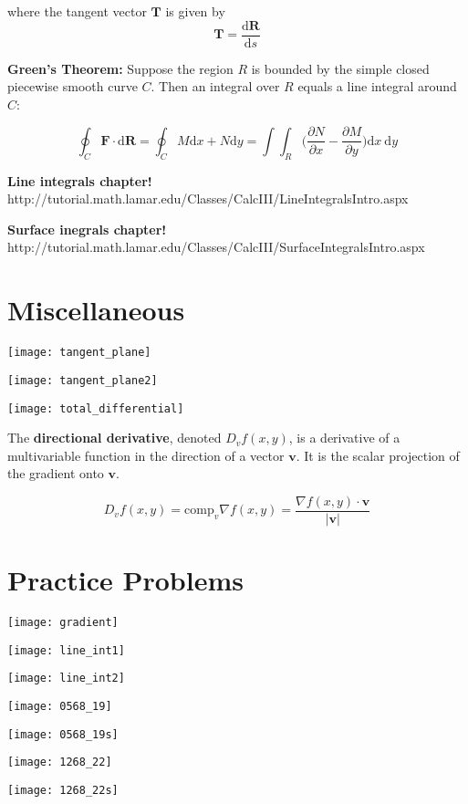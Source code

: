 where the tangent vector \(\boldsymbol{T}\) is given by \[\boldsymbol{T} = \frac{\text{d}\boldsymbol{R}}{\text{d}s}\]

\textbf{Green's Theorem:} Suppose the region \(R\) is bounded by the simple closed piecewise smooth curve \(C\). Then an integral over \(R\) equals a line integral around \(C\):

\[
\oint_C \boldsymbol{F} \cdot \text{d}\boldsymbol{R} = \oint_C M \text{d}x + N \text{d}y = \int \int_R \bigg( \frac{\partial N}{\partial x} - \frac{\partial M}{\partial y} \bigg) \text{d}x \ \text{d}y
\]

\textbf{Line integrals chapter!} http://tutorial.math.lamar.edu/Classes/CalcIII/LineIntegralsIntro.aspx

\textbf{Surface inegrals chapter!} http://tutorial.math.lamar.edu/Classes/CalcIII/SurfaceIntegralsIntro.aspx

\section{Miscellaneous}

\texttt{[image: tangent\_plane]}

\texttt{[image: tangent\_plane2]}

\texttt{[image: total\_differential]}

The \textbf{directional derivative}, denoted \(D_v f(x, y)\), is a derivative of a multivariable function in the direction of a vector \(\boldsymbol{v}\). It is the scalar projection of the gradient onto \(\boldsymbol{v}\).

\[
D_v f(x, y) = \text{comp}_v \nabla f(x, y) = \frac{\nabla f(x, y) \cdot \boldsymbol{v}}{|\boldsymbol{v}|}
\]

\section{Practice Problems}

\texttt{[image: gradient]}

\texttt{[image: line\_int1]}

\texttt{[image: line\_int2]}

\texttt{[image: 0568\_19]}

\texttt{[image: 0568\_19s]}

\texttt{[image: 1268\_22]}

\texttt{[image: 1268\_22s]}

